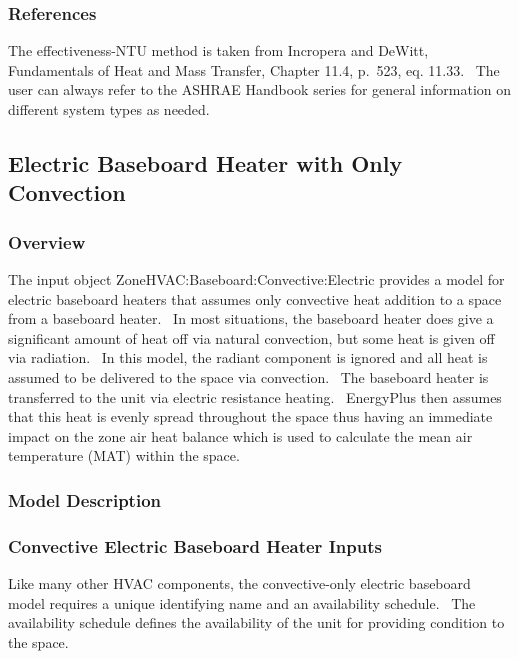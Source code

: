 \subsubsection{References}\label{references-006}

The effectiveness-NTU method is taken from Incropera and DeWitt, Fundamentals of Heat and Mass Transfer, Chapter 11.4, p.~523, eq. 11.33.~ The user can always refer to the ASHRAE Handbook series for general information on different system types as needed.

\subsection{Electric Baseboard Heater with Only Convection}\label{electric-baseboard-heater-with-only-convection}

\subsubsection{Overview}\label{overview-1-002}

The input object ZoneHVAC:Baseboard:Convective:Electric provides a model for electric baseboard heaters that assumes only convective heat addition to a space from a baseboard heater.~ In most situations, the baseboard heater does give a significant amount of heat off via natural convection, but some heat is given off via radiation.~ In this model, the radiant component is ignored and all heat is assumed to be delivered to the space via convection.~ The baseboard heater is transferred to the unit via electric resistance heating.~ EnergyPlus then assumes that this heat is evenly spread throughout the space thus having an immediate impact on the zone air heat balance which is used to calculate the mean air temperature (MAT) within the space.

\subsubsection{Model Description}\label{model-description-1-002}

\subsubsection{Convective Electric Baseboard Heater Inputs}\label{convective-electric-baseboard-heater-inputs}

Like many other HVAC components, the convective-only electric baseboard model requires a unique identifying name and an availability schedule.~ The availability schedule defines the availability of the unit for providing condition to the space.

